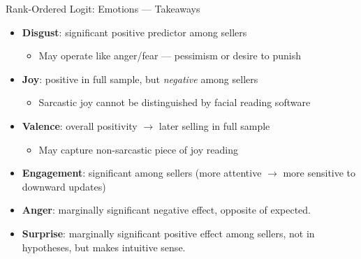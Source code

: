 \documentclass{beamer}
\begin{document}
\begin{frame}{Rank-Ordered Logit: Emotions --- Takeaways}
\begin{itemize}
    \item \textbf{Disgust}: significant positive predictor among sellers
    \begin{itemize}
        \item May operate like anger/fear --- pessimism or desire to punish
    \end{itemize}
    \item \textbf{Joy}: positive in full sample, but \textit{negative} among sellers
    \begin{itemize}
        \item Sarcastic joy cannot be distinguished by facial reading software
    \end{itemize}
    \item \textbf{Valence}: overall positivity $\rightarrow$ later selling in full sample
    \begin{itemize}
        \item May capture non-sarcastic piece of joy reading
    \end{itemize}
    \item \textbf{Engagement}: significant among sellers (more attentive $\rightarrow$ more sensitive to downward updates)
    \item \textbf{Anger}: marginally significant negative effect, opposite of expected.
    \item \textbf{Surprise}: marginally significant positive effect among sellers, not in hypotheses, but makes intuitive sense.
\end{itemize}
\end{frame}
\end{document}

